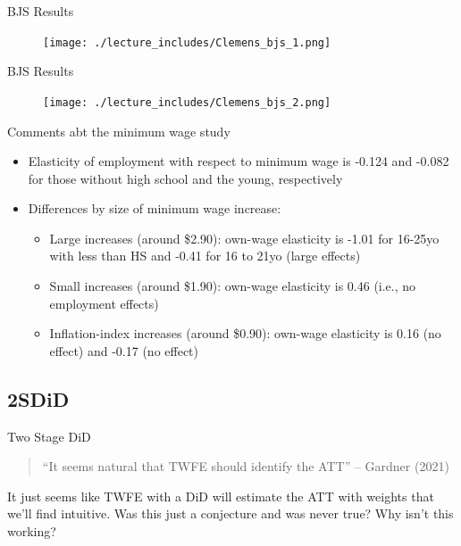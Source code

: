 \documentclass{beamer}
\begin{document}
\begin{frame}{BJS Results}

	\begin{figure}
	\texttt{[image: ./lecture\_includes/Clemens\_bjs\_1.png]}
	\end{figure}

\end{frame}

\begin{frame}{BJS Results}

	\begin{figure}
	\texttt{[image: ./lecture\_includes/Clemens\_bjs\_2.png]}
	\end{figure}

\end{frame}

\begin{frame}{Comments abt the minimum wage study}

\begin{itemize}
\item Elasticity of employment with respect to minimum wage is -0.124 and -0.082 for those without high school and the young, respectively
\item Differences by size of minimum wage increase:
	\begin{itemize}
	\item Large increases (around \$2.90): own-wage elasticity is -1.01 for 16-25yo with less than HS and -0.41 for 16 to 21yo (large effects)
	\item Small increases (around \$1.90): own-wage elasticity is 0.46 (i.e., no employment effects)
	\item Inflation-index increases (around \$0.90): own-wage elasticity is 0.16 (no effect) and -0.17 (no effect)
	\end{itemize}
\end{itemize}

\end{frame}

\subsection{2SDiD}

\begin{frame}{Two Stage DiD}

\begin{quote}
``It seems natural that TWFE should identify the ATT'' -- Gardner (2021)
\end{quote}

\bigskip

It just seems like TWFE with a DiD will estimate the ATT with weights that we'll find intuitive.  Was this just a conjecture and was never true?  Why isn't this working?

\end{frame}
\end{document}
